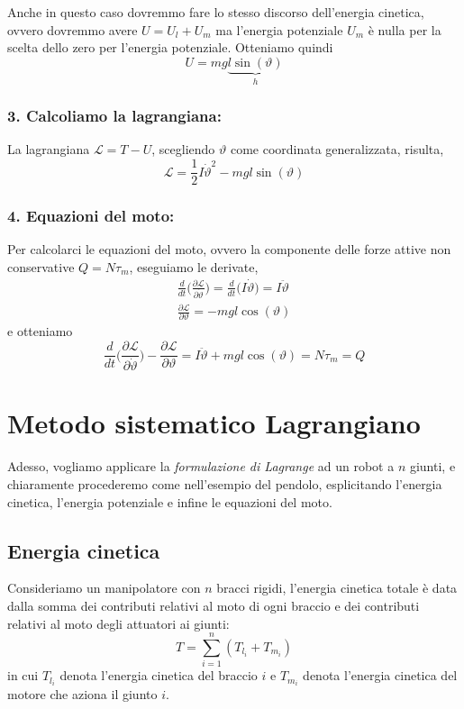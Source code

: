 Anche in questo caso dovremmo fare lo stesso discorso dell'energia cinetica, ovvero dovremmo avere $U = U_l + U_m$ ma l'energia potenziale $U_m$ è nulla per la scelta dello zero per l'energia potenziale. Otteniamo quindi
\begin{equation}
	U = mg\underbrace{l \sin(\vartheta)}_{h}
\end{equation}

\subsubsection{3. Calcoliamo la lagrangiana:}
La lagrangiana $\mathcal{L} = T - U$, scegliendo $\vartheta$ come coordinata generalizzata, risulta,
\begin{equation}
	\mathcal{L} = \frac{1}{2} I \dot{\vartheta}^2 - mgl \sin(\vartheta)
\end{equation}

\subsubsection{4. Equazioni del moto:}
Per calcolarci le equazioni del moto, ovvero la componente delle forze attive non conservative $Q = N \tau_m$, eseguiamo le derivate,
\begin{eqnarray}
	\frac{d}{dt} \Biggl( \frac{\partial \mathcal{L}}{\partial \dot{\vartheta}} \Biggr) = \frac{d}{dt} \Biggl( I\dot{\vartheta} \Biggr) = I \ddot{\vartheta} \\
	\frac{\partial \mathcal{L}}{\partial \vartheta} = -mg l \cos(\vartheta)
\end{eqnarray}
e otteniamo
\begin{equation}
	\frac{d}{dt} \Biggl( \frac{\partial \mathcal{L}}{\partial \dot{\vartheta}} \Biggr) - \frac{\partial \mathcal{L}}{\partial \vartheta} = I \ddot{\vartheta} + mgl \cos(\vartheta) = N\tau_m = Q
\end{equation}

\section{Metodo sistematico Lagrangiano}
Adesso, vogliamo applicare la \emph{formulazione di Lagrange} ad un robot a $n$ giunti, e chiaramente procederemo come nell'esempio del pendolo, esplicitando l'energia cinetica, l'energia potenziale e infine le equazioni del moto. 

\subsection{Energia cinetica}
Consideriamo un manipolatore con $n$ bracci rigidi, l'energia cinetica totale è data dalla somma dei contributi relativi al moto di ogni braccio e dei contributi relativi al moto degli attuatori ai giunti:
\begin{equation}
	T = \sum_{i = 1} ^{n} (T_{l_i} + T_{m_i})
\end{equation} 
in cui $T_{l_i}$ denota l'energia cinetica del braccio $i$ e $T_{m_i}$ denota l'energia cinetica del motore che aziona il giunto $i$.

